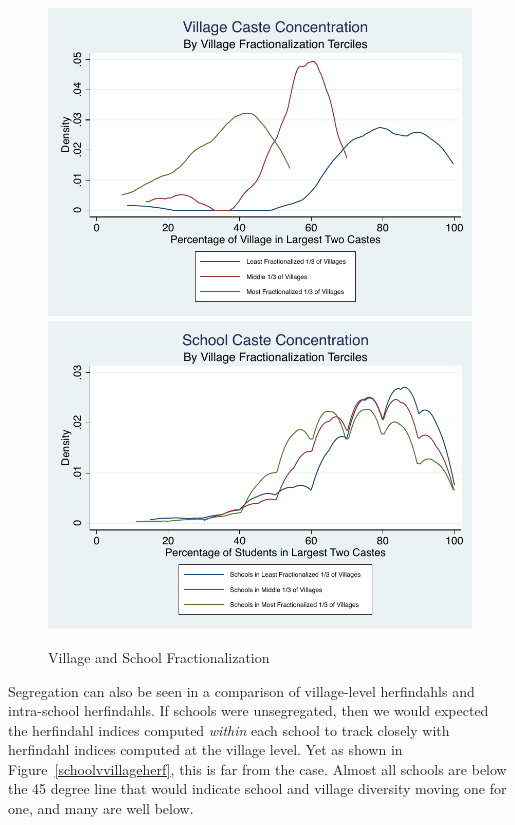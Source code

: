 \documentclass[Eubank_pk_ethnic_sorting.tex]{subfiles}
\begin{document}
\begin{figure}[H]
	\begin{center}
		\caption{Village and School Fractionalization}\label{toptwo}
		\includegraphics[scale=.6]{../results/village_toptwo.pdf}\includegraphics[scale=0.6]{../results/school_toptwo.pdf}
	\end{center}
\end{figure}

Segregation can also be seen in a comparison of village-level herfindahls and intra-school herfindahls. If schools were unsegregated, then we would expected the herfindahl indices computed \emph{within} each school to track closely with herfindahl indices computed at the village level. Yet as shown in Figure~\ref{schoolvvillageherf}, this is far from the case. Almost all schools are below the 45 degree line that would indicate school and village diversity moving one for one, and many are well below.
\end{document}
